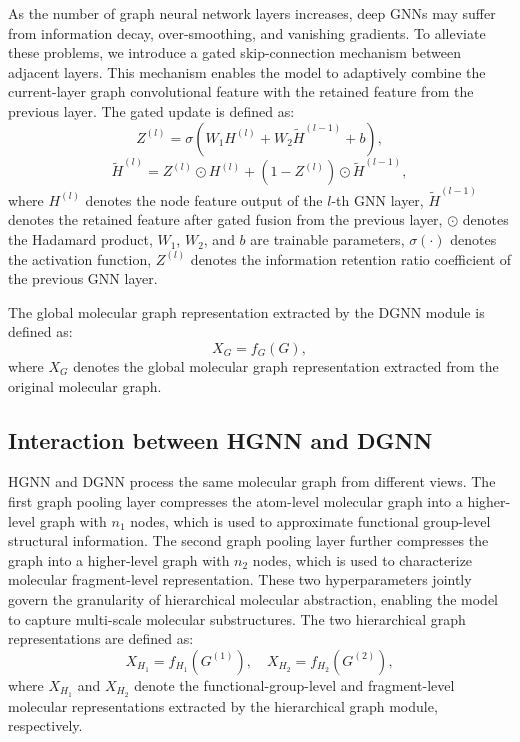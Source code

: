 \documentclass[pdflatex,sn-mathphys-num]{sn-jnl}%
\theoremstyle{thmstyleone}%
\theoremstyle{thmstyletwo}%
\theoremstyle{thmstylethree}%
\begin{document}
As the number of graph neural network layers increases, deep GNNs may suffer from information decay, over-smoothing, and vanishing gradients\cite{li2019deepgcns}. To alleviate these problems, we introduce a gated skip-connection mechanism between adjacent layers. This mechanism enables the model to adaptively combine the current-layer graph convolutional feature with the retained feature from the previous layer. The gated update is defined as:
\begin{equation}
Z^{(l)}=\sigma\left(W_1H^{(l)}+W_2\tilde{H}^{(l-1)}+b\right),
\end{equation}
\begin{equation}
\tilde{H}^{(l)}=Z^{(l)}\odot H^{(l)}+\left(1-Z^{(l)}\right)\odot \tilde{H}^{(l-1)},
\end{equation}
where $H^{(l)}$ denotes the node feature output of the $l$-th GNN layer, $\tilde{H}^{(l-1)}$ denotes the retained feature after gated fusion from the previous layer, $\odot$ denotes the Hadamard product, $W_1$, $W_2$, and $b$ are trainable parameters, $\sigma(\cdot )$ denotes the activation function, $Z^{(l)}$ denotes the information retention ratio coefficient of the previous GNN layer.

The global molecular graph representation extracted by the DGNN module is defined as:
\begin{equation}
X_G=f_G(G),
\end{equation}
where $X_G$ denotes the global molecular graph representation extracted from the original molecular graph.

\subsection{Interaction between HGNN and DGNN}
\label{subsec:hgnn_dgnn_interaction}

HGNN and DGNN process the same molecular graph from different views. The first graph pooling layer compresses the atom-level molecular graph into a higher-level graph with $n_1$ nodes, which is used to approximate functional group-level structural information. The second graph pooling layer further compresses the graph into a higher-level graph with $n_2$ nodes, which is used to characterize molecular fragment-level representation. These two hyperparameters jointly govern the granularity of hierarchical molecular abstraction, enabling the model to capture multi-scale molecular substructures. The two hierarchical graph representations are defined as:
\begin{equation}
X_{H_1}=f_{H_1}(G^{(1)}), \quad
X_{H_2}=f_{H_2}(G^{(2)}),
\label{eq:hgnn_outputs}
\end{equation}
where $X_{H_1}$ and $X_{H_2}$ denote the functional-group-level and fragment-level molecular representations extracted by the hierarchical graph module, respectively.
\end{document}
